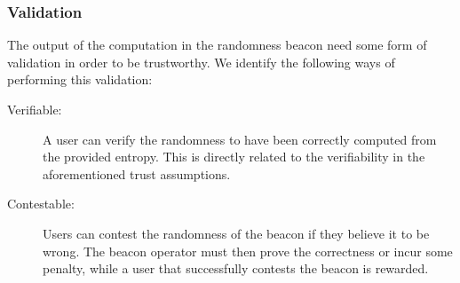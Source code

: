 \subsubsection{Validation}
The output of the computation in the randomness beacon need some form of validation in order to be trustworthy.
We identify the following ways of performing this validation:

\begin{description}
    \item[Verifiable:]
        A user can verify the randomness to have been correctly computed from the provided entropy.
        This is directly related to the verifiability in the aforementioned trust assumptions.

    \item[Contestable:]
        Users can contest the randomness of the beacon if they believe it to be wrong.
        The beacon operator must then prove the correctness or incur some penalty, while a user that successfully contests the beacon is rewarded. 
\end{description}



